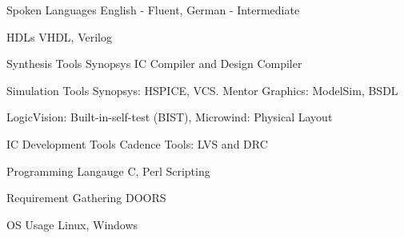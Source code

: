 

\begin{cvskills}

  \cvskill
	{Spoken Languages} %
	{English - Fluent, German - Intermediate} %

\cvskill
	{HDLs} %
	{VHDL, Verilog} %

\cvskill
	{Synthesis Tools} %
	{Synopsys IC Compiler and Design Compiler} %

  \cvskill
	{Simulation Tools} %
	{Synopsys: HSPICE, VCS. Mentor Graphics: ModelSim, BSDL } %
    
  \cvskill
	{} %
	{LogicVision: Built-in-self-test (BIST), Microwind: Physical Layout } %
    
  \cvskill
	{IC Development Tools} %
	{Cadence Tools: LVS and DRC} %

  \cvskill
	{Programming Langauge} %
	{C, Perl Scripting} %

  \cvskill
	{Requirement Gathering} %
	{DOORS} %

  \cvskill
	{OS Usage} %
	{Linux, Windows} %

\end{cvskills}
